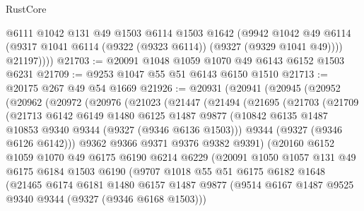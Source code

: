\begin{lexlean}{RustCore}
\begin{coremodule}
            @6111
            @1042
            @131
            @49
            @1503
            @6114
            @1503
            @1642
            (@9942
              @1042
              @49
              @6114
              (@9317 @1041 @6114 (@9322 (@9323 @6114)) (@9327 (@9329 @1041 @49))))
            @21197))))
@21703 := @20091 @1048 @1059 @1070 @49 @6143 @6152 @1503 @6231
@21709 := @9253 @1047 @55 @51 @6143 @6150 @1510
@21713 := @20175 @267 @49 @54 @1669
@21926 := @20931
    (@20941
      (@20945
        (@20952
          (@20962
            (@20972
              (@20976
                (@21023
                  (@21447
                    (@21494
                      (@21695
                        (@21703
                          (@21709
                            (@21713
                              @6142
                              @6149
                              @1480
                              @6125
                              @1487
                              @9877
                              (@10842 @6135 @1487 @10853 @9340 @9344 (@9327 (@9346 @6136 @1503)))
                              @9344
                              (@9327 (@9346 @6126 @6142)))
                            @9362
                            @9366
                            @9371
                            @9376
                            @9382
                            @9391)
                          (@20160
                            @6152
                            @1059
                            @1070
                            @49
                            @6175
                            @6190
                            @6214
                            @6229
                            (@20091
                              @1050
                              @1057
                              @131
                              @49
                              @6175
                              @6184
                              @1503
                              @6190
                              (@9707
                                @1018
                                @55
                                @51
                                @6175
                                @6182
                                @1648
                                (@21465
                                  @6174
                                  @6181
                                  @1480
                                  @6157
                                  @1487
                                  @9877
                                  (@9514 @6167 @1487 @9525 @9340 @9344 (@9327 (@9346 @6168 @1503)))

\end{coremodule}
\end{lexlean}
